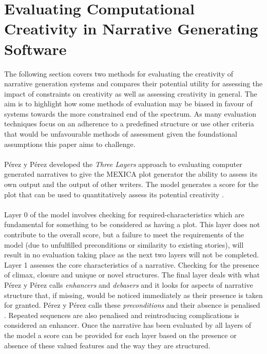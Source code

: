 \documentclass[letterpaper]{article}
\begin{document}
\section{Evaluating Computational Creativity in Narrative Generating Software} \label{sec:eval}
The following section covers two methods for evaluating the creativity of narrative generation systems and compares their potential utility for assessing the impact of constraints on creativity as well as assessing creativity in general. The aim is to highlight how  some methods of evaluation may be biased in favour of systems towards the more constrained end of the spectrum. As many evaluation techniques focus on an adherence to a predefined structure or use other criteria that would be unfavourable methods of assessment given the foundational assumptions this paper aims to challenge. 
\\
\\P\'erez y P\'erez developed the \emph{Three Layers} approach to evaluating computer generated narratives to give the MEXICA plot generator the ability to assess its own output and the output of other writers. The model generates a score for the plot that can be used to quantitatively assess its potential creativity \cite{y2014three}.\\
\\Layer 0 of the model involves checking for required-characteristics  which are fundamental for something to be considered as having a plot. This layer does not contribute to the overall score, but a failure to meet the requirements of the model (due to unfulfilled preconditions or similarity to existing stories), will result in no evaluation taking place as the next two layers will not be completed. Layer 1 assesses the core characteristics of a narrative. Checking for the presence of climax, closure and unique or novel structures. The final layer deals with what P\'erez y P\'erez calls \emph{enhancers} and \emph{debasers} and it looks for aspects of narrative structure that, if missing, would be noticed immediately as their presence is taken for granted. P\'erez y P\'erez calls these \emph{preconditions} and their absence is  penalised \cite{y2014three}. Repeated sequences are also penalised and reintroducing complications is considered an enhancer. Once the narrative has been evaluated by all layers of the model a score can be provided for each layer based on the presence or absence of these valued features and the way they are structured.\\
\end{document}
